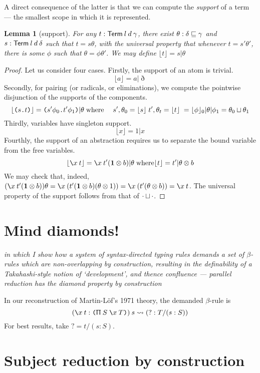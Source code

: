 \documentclass{jfp1}
\newtheorem{lemma}[theorem]{Lemma}
\newcommand{\Pa}[1]{\texttt{(}#1\texttt{)}}
\newcommand{\dt}{\texttt{.}}
\newcommand{\cn}[2]{\Pa{#1 \dt #2}}
\begin{document}
A direct consequence of the latter is that we can compute the
\emph{support} of a term --- the smallest scope in which it is
represented.
\newcommand{\supp}[1]{\lfloor #1 \rfloor}
\begin{lemma}[support]
  For any $t:\mathsf{Term}\:l\:d\:\gamma$, there exist $\theta:\delta\sqsubseteq\gamma$ and
  $s:\mathsf{Term}\:l\:d\:\delta$ such that $t = s\theta$, with the universal
  property that whenever $t=s'\theta'$, there is some $\phi$ such that
  $\theta=\phi\theta'$. We may define $\supp t = s|\theta$
\end{lemma}
\begin{proof}
  Let us consider four cases. Firstly, the support of an atom is
  trivial.
  \[
    \supp a = a|\eth
  \]
  Secondly, for pairing (or radicals, or
  eliminations), we compute the pointwise disjunction of the supports of the components.
  \[
    \supp{\cn st} = \cn{s'\phi_0}{t'\phi_1}|\theta\;\mbox{where}\quad
    \;s',\theta_0=\supp s\; t',\theta_t=\supp t\;
    =\supp\phi_0|\theta|\phi_1 = \cp{\theta_0}{\theta_1} \\
  \]
  Thirdly, variables have singleton support.
  \[
    \supp x = 1|x
  \]
  Fourthly, the support of an abstraction requires us to separate the
  bound variable from the free variables.
  \[
    \supp{\la xt} = \la xt'(\ith\otimes b)|\theta\;\mbox{where}\supp
    t=t'|\theta\otimes b
  \]
  We may check that, indeed,
  $(\la xt'(\ith\otimes b))\theta
  = \la x(t'(\ith\otimes b)(\theta\otimes 1))
  = \la x(t'(\theta\otimes b)) = \la xt$.
  The universal property of the support follows from that of $\cdot \sqcup \cdot$.
\end{proof}


\section{Mind diamonds!}

\emph{in which I show how a system of syntax-directed typing rules demands a set of $\beta$-rules
  which are non-overlapping by construction, resulting in the definability of a Takahashi-style notion of `development', and thence confluence --- parallel reduction has the diamond property by construction}

In our reconstruction of Martin-L\"of's 1971 theory, the demanded $\beta$-rule is
\[
  (\la x t : \PI SxT)\:s \leadsto (? : T/(s:S))
\]
For best results, take $? = t/(s:S)$.


\section{Subject reduction by construction}
\end{document}
